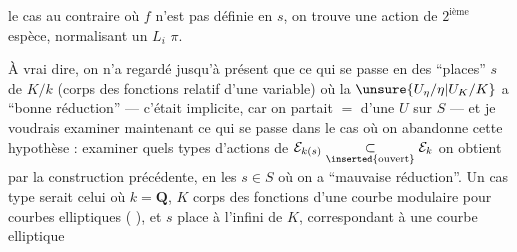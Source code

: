 le cas au contraire où  $f$ n'est pas définie en $s$, on trouve une  action de $2^{\text{ième}}$ espèce, normalisant un $L_i$   $\pi$.

À vrai dire, on n'a regardé jusqu'à présent que ce qui se passe en des ``places'' $s$ de $K/k$ (corps des fonctions relatif d'une variable) où la   $\unsure{U_\eta/\eta|U_K/K}$ a ``bonne réduction'' --- c'était implicite, car on partait $=$ d'une $U$ sur $S$ --- et je voudrais examiner maintenant ce qui se passe dans le cas où on abandonne cette hypothèse : examiner quels types d'actions de $\mathcal E_{k(s)}\underset{\inserted{\text{ouvert}}}{\subset}\mathcal E_k$ on obtient par la construction précédente, en les $s\in S$ où on a ``mauvaise réduction''. Un cas type serait celui où $k=\mathbf Q$, $K$ corps des fonctions d'une courbe modulaire pour courbes elliptiques ( ), et $s$ place à l'infini de $K$, correspondant à une courbe elliptique
